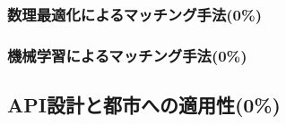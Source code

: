       \subsubsection{数理最適化によるマッチング手法(0\%)}
        \label{sec:数理最適化によるマッチング手法}
          \par
          
      \subsubsection{機械学習によるマッチング手法(0\%)}
        \label{sec:機械学習によるマッチング手法}
          \par    
          
  \subsection{API設計と都市への適用性(0\%)}
    \label{sec:API設計と都市への適用性}
      \par 
